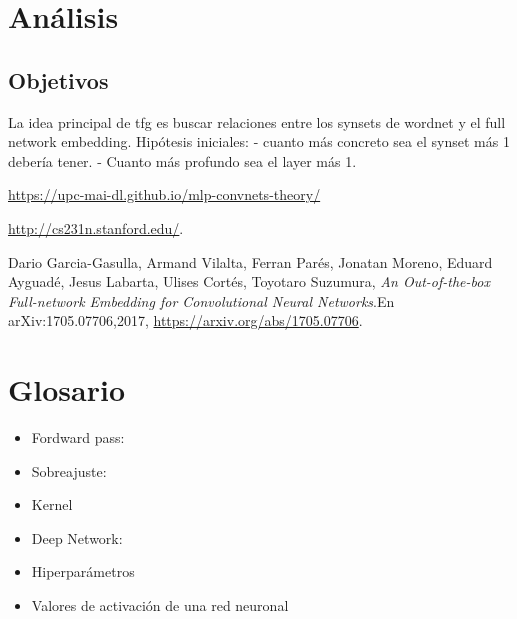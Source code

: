 \documentclass[12,twoside]{TFG-GM}
\theoremstyle{definition}
\theoremstyle{remark}
\begin{document}
\section{Análisis}
\subsection{Objetivos}
La idea principal de tfg es buscar relaciones entre los synsets de wordnet y el full network embedding. 
Hipótesis iniciales: 
- cuanto más concreto sea el synset más 1 debería tener.
- Cuanto más profundo sea el layer más 1.



\begin{thebibliography}{9}
\url{https://upc-mai-dl.github.io/mlp-convnets-theory/}

\url{http://cs231n.stanford.edu/}. 

Dario Garcia-Gasulla, Armand Vilalta, Ferran Parés, Jonatan Moreno, Eduard Ayguadé, Jesus Labarta, Ulises Cortés, Toyotaro Suzumura, 
\textit{An Out-of-the-box Full-network Embedding for
Convolutional Neural Networks}.En arXiv:1705.07706,2017, \url{https://arxiv.org/abs/1705.07706}. 
\end{thebibliography}


\appendix
\vfill\newpage 
\section{Glosario}
\begin{itemize}
\item Fordward pass: 
\item Sobreajuste: 
\item Kernel
\item Deep Network:
\item Hiperparámetros
\item Valores de activación de una red neuronal
\end{itemize}
\end{document}
